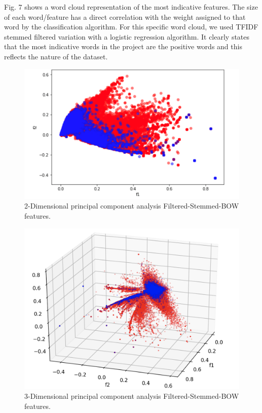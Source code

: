 \documentclass[conference , 11pt]{IEEEtran}
\begin{document}
Fig. 7 shows a word cloud representation of the most indicative features. The size of each word/feature has a direct correlation with the weight assigned to that word by the classification algorithm. For this specific word cloud, we used TFIDF stemmed filtered variation with a logistic regression algorithm. It clearly states that the most indicative words in the project are the positive words and this reflects the nature of the dataset.

\begin{figure}[htbp]
\centerline{\includegraphics[width=\columnwidth]{pca.png}}
\caption{2-Dimensional principal component analysis Filtered-Stemmed-BOW features.}
\label{fig}
\end{figure}
\begin{figure}[htbp]
\centerline{\includegraphics[width=\columnwidth]{3d-pca.png}}
\caption{3-Dimensional principal component analysis Filtered-Stemmed-BOW features.}
\label{fig}
\end{figure}
\end{document}
